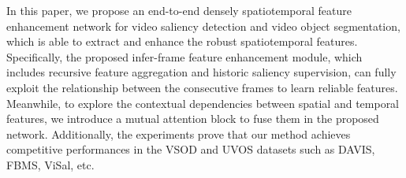 \documentclass[12pt]{article}
\begin{document}
In this paper, we propose an end-to-end densely spatiotemporal feature enhancement network for video saliency detection and video object segmentation, which is able to extract and enhance the robust spatiotemporal features. Specifically, the proposed infer-frame feature enhancement module, which includes recursive feature aggregation and historic saliency supervision, can fully exploit the relationship between the consecutive frames to learn reliable features. Meanwhile, to explore the contextual dependencies between spatial and temporal features, we introduce a mutual attention block to fuse them in the proposed network. Additionally, the experiments prove that our method achieves competitive performances in the VSOD and UVOS datasets such as DAVIS, FBMS, ViSal, etc.  
 
\begin{comment}
@inproceedings{wang2016saliency,
  title={Saliency detection with recurrent fully convolutional networks},
  author={Wang, Linzhao and Wang, Lijun and Lu, Huchuan and Zhang, Pingping and Ruan, Xiang},
  booktitle={European conference on computer vision},	
  pages={825--841},
  year={2016},
  organization={Springer}
}

@inproceedings{hu2018squeeze,
  title={Squeeze-and-excitation networks},
  author={Hu, Jie and Shen, Li and Sun, Gang},
  booktitle={Proceedings of the IEEE conference on computer vision and pattern recognition},
  pages={7132--7141},
  year={2018}
}

@article{chen2017rethinking,
  title={Rethinking atrous convolution for semantic image segmentation},
  author={Chen, Liang-Chieh and Papandreou, George and Schroff, Florian and Adam, Hartwig},
  journal={arXiv preprint arXiv:1706.05587},
  year={2017}
}

@inproceedings{deng2018r3net,
  title={R3Net: Recurrent residual refinement network for saliency detection},
  author={Deng, Zijun and Hu, Xiaowei and Zhu, Lei and Xu, Xuemiao and Qin, Jing and Han, Guoqiang and Heng, Pheng-Ann},
  booktitle={Proceedings of the 27th International Joint Conference on Artificial Intelligence},
  pages={684--690},
  year={2018},
  organization={AAAI Press}
}
	
@inproceedings{fu2019dual,
  title={Dual attention network for scene segmentation},
  author={Fu, Jun and Liu, Jing and Tian, Haijie and Li, Yong and Bao, Yongjun and Fang, Zhiwei and Lu, Hanqing},
  booktitle={Proceedings of the IEEE Conference on Computer Vision and Pattern Recognition},
  pages={3146--3154},
  year={2019}
}


\end{comment}
\end{document}
